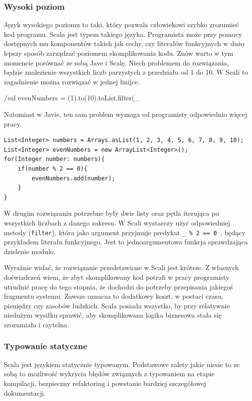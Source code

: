 \documentclass[brudnopis]{xmgr}
\begin{document}
\subsubsection{Wysoki poziom}

Język wysokiego poziomu to taki, który pozwala człowiekowi szybko zrozumieć kod programu. Scala jest typem takiego języka. Programista może przy pomocy dostępnych mu komponentów takich jak cechy, czy literałów funkcyjnych w dużo lepszy sposób zarządzać poziomem skomplikowania kodu. Znów warto w tym momencie porównać ze sobą Jave i Scalę. Niech problemem do rozwiązania, będzie znalezienie wszystkich liczb parzystych z przedziału od 1 do 10. W Scali to zagadnienie można rozwiązać w jednej linijce.

/val evenNumbers = (1).to(10).toList.filter(_ %

Natomiast w Javie, ten sam problem wymaga od programisty odpowiednio więcej pracy.

\begin{verbatim}
List<Integer> numbers = Arrays.asList(1, 2, 3, 4, 5, 6, 7, 8, 9, 10);
List<Integer> evenNumbers = new ArrayList<Integer>();
for(Integer number: numbers){
    if(number % 2 == 0){
        evenNumbers.add(number);
    }
}
\end{verbatim}

W drugim rozwiązaniu potrzebne były dwie listy oraz pętla iterująca po wszystkich liczbach z danego zakresu. W Scali wystarczy użyć odpowiedniej metody (\texttt{filter}), która jako argument przyjmuje predykat \texttt{\_ \% 2 == 0 }, będący przykładem literału funkcyjnego. Jest to jednoargumentowa funkcja sprawdzająca dzielenie modulo.

Wyraźnie widać, że rozwiązanie przedstawione w Scali jest krótsze. Z własnych doświadczeń wiem, że zbyt skomplikowany kod potrafi w pracy programisty utrudnić pracę do tego stopnia, że dochodzi do potrzeby przepisania jakiegoś fragmentu systemu. Zawsze oznacza to dodatkowy koszt, w postaci czasu, pieniędzy czy zasobów ludzkich. Scala posiada wszystko, by przy relatywnie niedużym wysiłku sprawić, aby skomplikowana logika biznesowa stała się zrozumiała i czytelna.

\subsubsection{Typowanie statyczne}

Scala jest językiem statycznie typowanym. Podstawowe zalety jakie niesie to ze sobą to możliwość wykrycia błędów związnych z typowaniem na etapie kompilacji, bezpieczny refaktoring i powstanie bardziej szczegółowej dokumentacji. 
\end{document}
